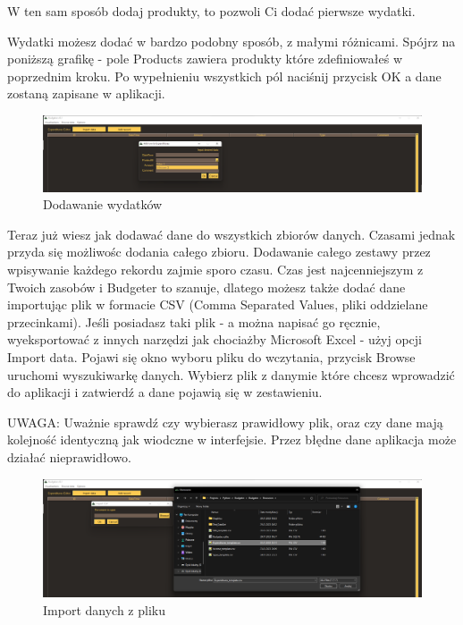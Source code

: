 \documentclass[a4paper,10pt, twoside]{report}
\begin{document}
{W ten sam sposób dodaj produkty, to pozwoli Ci dodać pierwsze wydatki.}

\medskip
{Wydatki możesz dodać w bardzo podobny sposób, z małymi różnicami. Spójrz na 
poniższą grafikę - pole Products zawiera produkty które zdefiniowałeś w 
poprzednim kroku. Po wypełnieniu wszystkich pól naciśnij przycisk OK a dane 
zostaną zapisane w aplikacji.}

\begin{figure}[H]           %
    \caption{Dodawanie wydatków}
    \label{fig:Dodawanie wydatków}
    \centering
    \includegraphics[width=12cm]{figures/Guide/Budgeter_Instruction_04_browse_p4_espenditures.png}
\end{figure}

{Teraz już wiesz jak dodawać dane do wszystkich zbiorów danych. Czasami jednak 
przyda się możliwośc dodania całego zbioru. Dodawanie całego zestawy przez 
wpisywanie każdego rekordu zajmie sporo czasu. Czas jest najcenniejszym z Twoich
 zasobów i Budgeter to szanuje, dlatego możesz także dodać dane importując plik 
w formacie CSV (Comma Separated Values, pliki oddzielane przecinkami). Jeśli 
posiadasz taki plik - a można napisać go ręcznie, wyeksportować z innych 
narzędzi jak chociażby Microsoft Excel - użyj opcji Import data. Pojawi się okno
 wyboru pliku do wczytania, przycisk Browse uruchomi wyszukiwarkę danych. 
Wybierz plik z danymie które chcesz wprowadzić do aplikacji i zatwierdź a dane 
pojawią się w zestawieniu.}

{UWAGA: Uważnie sprawdź czy wybierasz prawidłowy plik, oraz czy dane mają 
kolejność identyczną jak wiodczne w interfejsie. Przez błędne dane aplikacja 
może działać nieprawidłowo.}

\begin{figure}[H]           %
    \caption{Import danych z pliku}
    \label{fig:Import danych z pliku}
    \centering
    \includegraphics[width=12cm]{figures/Guide/Budgeter_Instruction_05_import-from-csv.png}
\end{figure}
\end{document}
